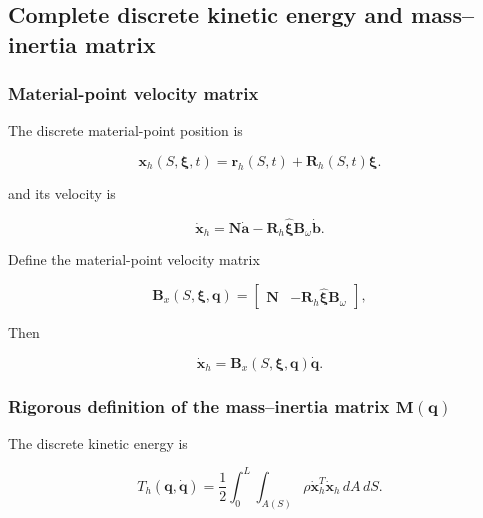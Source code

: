 \subsection{Complete discrete kinetic energy and mass--inertia matrix}\label{sec:galerkin-2-4}

\subsubsection{Material-point velocity matrix}\label{sec:galerkin-2-4-1}

The discrete material-point position is

\begin{equation}
\label{eq:galerkin-2-32}
\mathbf{x}_{h}\left( S,\bm{\xi},t \right) = \mathbf{r}_{h}(S,t) + \mathbf{R}_{h}(S,t)\bm{\xi}.
\end{equation}

and its velocity is

\begin{equation}
\label{eq:galerkin-2-33}
{\dot{\mathbf{x}}}_{h} = \mathbf{N}\dot{\mathbf{a}} - \mathbf{R}_{h}\widehat{\bm{\xi}}\mathbf{B}_{\omega}\dot{\mathbf{b}}.
\end{equation}

Define the material-point velocity matrix

\begin{equation}
\label{eq:galerkin-2-34}
\mathbf{B}_{x}\left( S,\bm{\xi},\mathbf{q} \right) = \begin{bmatrix}
\mathbf{N} & - \mathbf{R}_{h}\widehat{\bm{\xi}}\mathbf{B}_{\omega}
\end{bmatrix},
\end{equation}

Then

\begin{equation}
\label{eq:galerkin-2-35}
{\dot{\mathbf{x}}}_{h} = \mathbf{B}_{x}\left( S,\bm{\xi},\mathbf{q} \right)\dot{\mathbf{q}}.
\end{equation}

\subsubsection{\texorpdfstring{Rigorous definition of the mass--inertia matrix \(\mathbf{M}\left( \mathbf{q} \right)\)}{Rigorous definition of the mass--inertia matrix M(q)}}\label{sec:galerkin-2-4-2}

The discrete kinetic energy is

\begin{equation}
\label{eq:galerkin-2-36}
T_{h}\left( \mathbf{q},\dot{\mathbf{q}} \right) = \frac{1}{2}\int_{0}^{L}{\int_{A(S)}^{}\rho}{\dot{\mathbf{x}}}_{h}^{T}{\dot{\mathbf{x}}}_{h}\, dA\, dS.
\end{equation}

